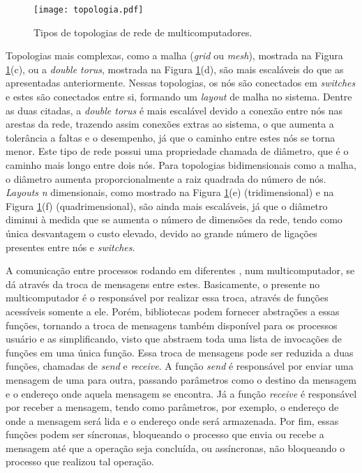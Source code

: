 \begin{figure}[tb]
  \centering
  \caption{Tipos de topologias de rede de multicomputadores.}
  \label{fig:topologiamulticomputadores}
  \texttt{[image: topologia.pdf]}
\end{figure}

Topologias mais complexas, como a malha (\textit{grid} ou \textit{mesh}), mostrada na Figura \ref{fig:topologiamulticomputadores}(c), ou a \textit{double torus}, mostrada na Figura \ref{fig:topologiamulticomputadores}(d), são mais escaláveis do que as apresentadas anteriormente. Nessas topologias, os nós são conectados em \textit{switches} e estes são conectados entre si, formando um \textit{layout} de malha no sistema. Dentre as duas citadas, a \textit{double torus} é mais escalável devido a conexão entre nós nas arestas da rede, trazendo assim conexões extras ao sistema, o que aumenta a tolerância a faltas e o desempenho, já que o caminho entre estes nós se torna menor. Este tipo de rede possui uma propriedade chamada de diâmetro, que é o caminho mais longo entre dois nós. Para topologias bidimensionais como a malha, o diâmetro aumenta proporcionalmente a raiz quadrada do número de nós. \textit{Layouts} \textit{n} dimensionais, como mostrado na Figura \ref{fig:topologiamulticomputadores}(e) (tridimensional) e na Figura \ref{fig:topologiamulticomputadores}(f) (quadrimensional), são ainda mais escaláveis, já que o diâmetro diminui à medida que se aumenta o número de dimensões da rede, tendo como única desvantagem o custo elevado, devido ao grande número de ligações presentes entre nós e \textit{switches}.

A comunicação entre processos rodando em diferentes \CPUs, num multicomputador, se dá através da troca de mensagens entre estes. Basicamente, o \SO presente no multicomputador é o responsável por realizar essa troca, através de funções acessíveis somente a ele. Porém, bibliotecas podem fornecer abstrações a essas funções, tornando a troca de mensagens também disponível para os processos usuário e as simplificando, visto que abstraem toda uma lista de invocações de funções em uma única função. Essa troca de mensagens pode ser reduzida a duas funções, chamadas de \textit{send} e \textit{receive}. A função \textit{send} é responsável por enviar uma mensagem de uma \CPU para outra, passando parâmetros como o destino da mensagem e o endereço onde aquela mensagem se encontra. Já a função \textit{receive} é responsável por receber a mensagem, tendo como parâmetros, por exemplo, o endereço de onde a mensagem será lida e o endereço onde será armazenada. Por fim, essas funções podem ser síncronas, bloqueando o processo que envia ou recebe a mensagem até que a operação seja concluída, ou assíncronas, não bloqueando o processo que realizou tal operação.

